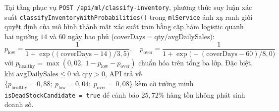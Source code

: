 Tại tầng phục vụ \texttt{POST /api/ml/classify-inventory}, phương thức suy luận xác suất \texttt{classifyInventory\allowbreak{}WithProbabilities()} trong \texttt{mlService} ánh xạ ranh giới quyết định của mô hình thành mặt xác suất trơn bằng cặp hàm logistic quanh hai ngưỡng $14$ và $60$ ngày bao phủ ($\text{coverDays} = \text{qty} / \text{avgDailySales}$):
\begin{equation}
	p_{\text{low}} = \dfrac{1}{1 + \exp\!\bigl((\text{coverDays} - 14)/3{,}5\bigr)}, \quad
	p_{\text{over}} = \dfrac{1}{1 + \exp\!\bigl(-(\text{coverDays} - 60)/8{,}0\bigr)}
\end{equation}
với $p_{\text{healthy}} = \max(0{,}02,\ 1 - p_{\text{low}} - p_{\text{over}})$ chuẩn hóa trên tổng ba lớp. Đặc biệt, khi $\text{avgDailySales} \le 0$ và $\text{qty} > 0$, API trả về $\{p_{\text{healthy}}=0{,}88;\ p_{\text{low}}=0{,}04;\ p_{\text{over}}=0{,}08\}$ kèm cờ tường minh \texttt{isDeadStockCandidate = true} để cảnh báo $25{,}72\%$ hàng tồn không phát sinh doanh số.
